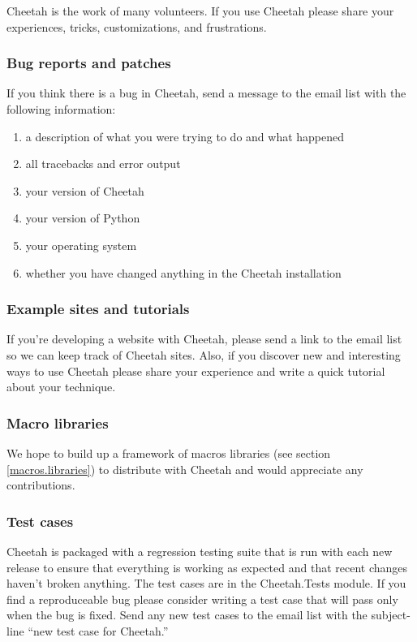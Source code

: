 Cheetah is the work of many volunteers.  If you use Cheetah please share your
experiences, tricks, customizations, and frustrations.

\subsubsection{Bug reports and patches}

If you think there is a bug in Cheetah, send a message to the email list
with the following information:

\begin{enumerate}
\item a description of what you were trying to do and what happened
\item all tracebacks and error output
\item your version of Cheetah
\item your version of Python
\item your operating system
\item whether you have changed anything in the Cheetah installation
\end{enumerate}

\subsubsection{Example sites and tutorials}
If you're developing a website with Cheetah, please send a link to the
email list so we can keep track of Cheetah sites.  Also, if you discover
new and interesting ways to use Cheetah please share your experience and
write a quick tutorial about your technique.

\subsubsection{Macro libraries}
We hope to build up a framework of macros libraries (see section
\ref{macros.libraries}) to distribute with Cheetah and would appreciate
any contributions.

\subsubsection{Test cases}
Cheetah is packaged with a regression testing suite that is run with each
new release to ensure that everything is working as expected and that recent
changes haven't broken anything.  The test cases are in the Cheetah.Tests
module.  If you find a reproduceable bug please consider writing a test case
that will pass only when the bug is fixed.  Send any new test cases to the email
list with the subject-line ``new test case for Cheetah.''

